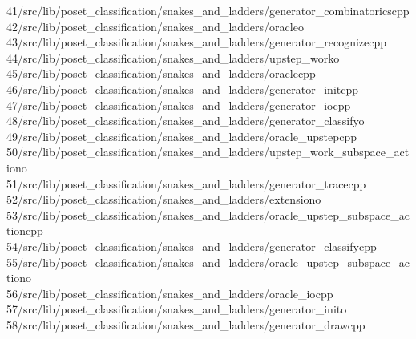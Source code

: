\begin{tabbing}
41\>/src/lib/poset\_classification/snakes\_and\_ladders/generator\_combinatoricscpp\\[0pt]
42\>/src/lib/poset\_classification/snakes\_and\_ladders/oracleo\\[0pt]
43\>/src/lib/poset\_classification/snakes\_and\_ladders/generator\_recognizecpp\\[0pt]
44\>/src/lib/poset\_classification/snakes\_and\_ladders/upstep\_worko\\[0pt]
45\>/src/lib/poset\_classification/snakes\_and\_ladders/oraclecpp\\[0pt]
46\>/src/lib/poset\_classification/snakes\_and\_ladders/generator\_initcpp\\[0pt]
47\>/src/lib/poset\_classification/snakes\_and\_ladders/generator\_iocpp\\[0pt]
48\>/src/lib/poset\_classification/snakes\_and\_ladders/generator\_classifyo\\[0pt]
49\>/src/lib/poset\_classification/snakes\_and\_ladders/oracle\_upstepcpp\\[0pt]
50\>/src/lib/poset\_classification/snakes\_and\_ladders/upstep\_work\_subspace\_actiono\\[0pt]
51\>/src/lib/poset\_classification/snakes\_and\_ladders/generator\_tracecpp\\[0pt]
52\>/src/lib/poset\_classification/snakes\_and\_ladders/extensiono\\[0pt]
53\>/src/lib/poset\_classification/snakes\_and\_ladders/oracle\_upstep\_subspace\_actioncpp\\[0pt]
54\>/src/lib/poset\_classification/snakes\_and\_ladders/generator\_classifycpp\\[0pt]
55\>/src/lib/poset\_classification/snakes\_and\_ladders/oracle\_upstep\_subspace\_actiono\\[0pt]
56\>/src/lib/poset\_classification/snakes\_and\_ladders/oracle\_iocpp\\[0pt]
57\>/src/lib/poset\_classification/snakes\_and\_ladders/generator\_inito\\[0pt]
58\>/src/lib/poset\_classification/snakes\_and\_ladders/generator\_drawcpp\\[0pt]

\end{tabbing}
